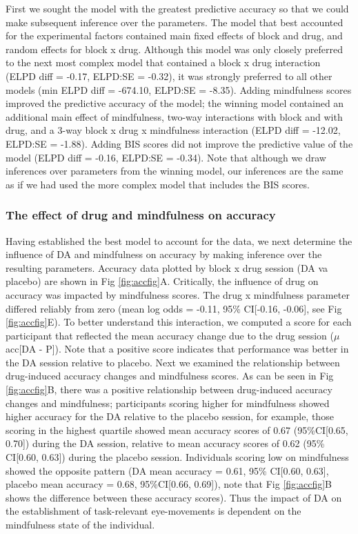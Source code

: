 \documentclass{article}
\begin{document}
First we sought the model with the greatest predictive accuracy so that
we could make subsequent inference over the parameters. The model that
best accounted for the experimental factors contained main fixed effects
of block and drug, and random effects for block x drug. Although this
model was only closely preferred to the next most complex model that
contained a block x drug interaction (ELPD diff = -0.17, ELPD:SE =
-0.32), it was strongly preferred to all other models (min ELPD diff =
-674.10, ELPD:SE = -8.35). Adding mindfulness scores improved the
predictive accuracy of the model; the winning model contained an
additional main effect of mindfulness, two-way interactions with block
and with drug, and a 3-way block x drug x mindfulness interaction (ELPD
diff = -12.02, ELPD:SE = -1.88). Adding BIS scores did not improve the
predictive value of the model (ELPD diff = -0.16, ELPD:SE = -0.34). Note
that although we draw inferences over parameters from the winning model,
our inferences are the same as if we had used the more complex model
that includes the BIS scores.

\hypertarget{the-effect-of-drug-and-mindfulness-on-accuracy}{%
\subsubsection{The effect of drug and mindfulness on
accuracy}\label{the-effect-of-drug-and-mindfulness-on-accuracy}}

Having established the best model to account for the data, we next
determine the influence of DA and mindfulness on accuracy by making
inference over the resulting parameters. Accuracy data plotted by block
x drug session (DA va placebo) are shown in Fig \ref{fig:accfig}A.
Critically, the influence of drug on accuracy was impacted by
mindfulness scores. The drug x mindfulness parameter differed reliably
from zero (mean log odds = -0.11, 95\% CI{[}-0.16, -0.06{]}, see Fig
\ref{fig:accfig}E). To better understand this interaction, we computed a
score for each participant that reflected the mean accuracy change due
to the drug session (\(\mu\) acc{[}DA - P{]}). Note that a positive
score indicates that performance was better in the DA session relative
to placebo. Next we examined the relationship between drug-induced
accuracy changes and mindfulness scores. As can be seen in Fig
\ref{fig:accfig}B, there was a positive relationship between
drug-induced accuracy changes and mindfulness; participants scoring
higher for mindfulness showed higher accuracy for the DA relative to the
placebo session, for example, those scoring in the highest quartile
showed mean accuracy scores of 0.67 (95\%CI{[}0.65, 0.70{]}) during the
DA session, relative to mean accuracy scores of 0.62 (95\% CI{[}0.60,
0.63{]}) during the placebo session. Individuals scoring low on
mindfulness showed the opposite pattern (DA mean accuracy = 0.61, 95\%
CI{[}0.60, 0.63{]}, placebo mean accuracy = 0.68, 95\%CI{[}0.66,
0.69{]}), note that Fig \ref{fig:accfig}B shows the difference between
these accuracy scores). Thus the impact of DA on the establishment of
task-relevant eye-movements is dependent on the mindfulness state of the
individual.
\end{document}

